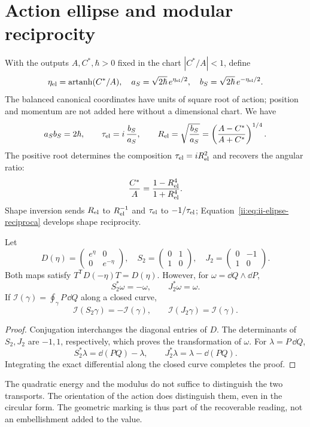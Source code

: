 \section{Action ellipse and modular reciprocity}
\label{ii:sec:ellipse} With the outputs $A,C^*,\hbar>0$ fixed in the chart $|C^*/A|<1$, define
\[
\eta_{\rm el}=\operatorname{artanh}(C^*/A),\quad
a_S=\sqrt{2\hbar}\,e^{\eta_{\rm el}/2},\quad
b_S=\sqrt{2\hbar}\,e^{-\eta_{\rm el}/2}.
\]
The balanced canonical coordinates have units of square root of action; position and momentum are not added here without a dimensional chart. We have
\[
a_Sb_S=2\hbar,\qquad
\tau_{\rm el}=i\,\frac{b_S}{a_S},\qquad
R_{\rm el}=\sqrt{\frac{b_S}{a_S}}
=\left(\frac{A-C^*}{A+C^*}\right)^{1/4}.
\]
The positive root determines the composition $\tau_{\rm el}=iR_{\rm el}^2$ and recovers the angular ratio:
\[
\frac{C^*}{A}=\frac{1-R_{\rm el}^4}{1+R_{\rm el}^4}.
\]
Shape inversion sends $R_{\rm el}$ to $R_{\rm el}^{-1}$ and $\tau_{\rm el}$ to $-1/\tau_{\rm el}$; Equation~\eqref{ii:eq:ii-elipse-reciproca} develops shape reciprocity.

\begin{proposition}
Let
\[
D(\eta)=\begin{pmatrix}e^\eta&0\\0&e^{-\eta}\end{pmatrix},
\quad
S_2=\begin{pmatrix}0&1\\1&0\end{pmatrix},
\quad
J_2=\begin{pmatrix}0&-1\\1&0\end{pmatrix}.
\]
Both maps satisfy $T^{\mathsf T}D(-\eta)T=D(\eta)$.
However, for $\omega=\dd Q\wedge\dd P$,
\[
S_2^*\omega=-\omega,\qquad J_2^*\omega=\omega.
\]
If $\mathcal I(\gamma)=\oint_\gamma P\,\dd Q$ along a closed curve,
\[
\mathcal I(S_2\gamma)=-\mathcal I(\gamma),\qquad
\mathcal I(J_2\gamma)=\mathcal I(\gamma).
\]
\end{proposition}
\begin{proof}
Conjugation interchanges the diagonal entries of $D$.
The determinants of $S_2,J_2$ are $-1,1$, respectively, which proves the transformation of $\omega$. For $\lambda=P\,\dd Q$,
\[
S_2^*\lambda=\dd(PQ)-\lambda,\qquad
J_2^*\lambda=\lambda-\dd(PQ).
\]
Integrating the exact differential along the closed curve completes the proof.
\end{proof}

The quadratic energy and the modulus do not suffice to distinguish the two transports. The orientation of the action does distinguish them, even in the circular form. The geometric marking is thus part of the recoverable reading, not an embellishment added to the value.

